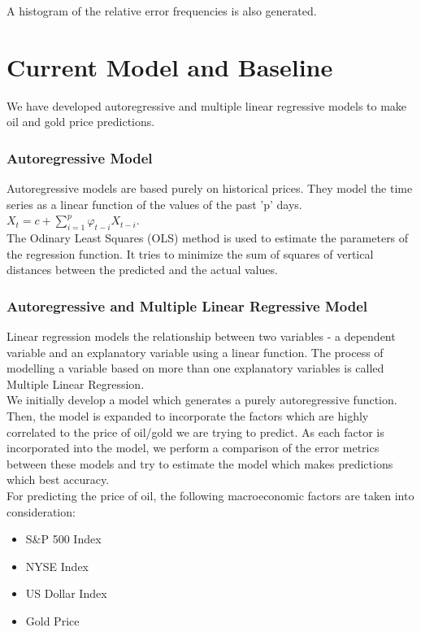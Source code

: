 \documentclass[runningheads]{llncs}
\begin{document}
A histogram of the relative error frequencies is also generated. \\

\newpage

\section{Current Model and Baseline}

We have developed autoregressive and multiple linear regressive models to make oil and gold price predictions.

\subsubsection{Autoregressive Model}
Autoregressive models are based purely on historical prices. They model the time series as a linear function of the values of the past 'p' days.\\

$ X_{t} = c + \sum\limits_{i=1}^p \varphi_{t-i}X_{t-i}$. \\

\noindent The Odinary Least Squares (OLS) method is used to estimate the parameters of the regression function. It tries to minimize the sum of squares of vertical distances between the predicted and the actual values. 

\subsubsection{Autoregressive and Multiple Linear Regressive Model}
Linear regression models the relationship between two variables - a dependent variable and an explanatory variable using a linear function. The process of modelling a variable based on more than one explanatory variables is called Multiple Linear Regression. \\
   
\noindent We initially develop a model which generates a purely autoregressive function. Then, the model is expanded to incorporate the factors which are highly correlated to the price of oil/gold we are trying to predict. As each factor is incorporated into the model, we perform a comparison of the error metrics between these models and try to estimate the model which makes predictions which best accuracy.\\

For predicting the price of oil, the following macroeconomic factors are taken into consideration:
\begin {itemize}
\item S\&P 500 Index
\item NYSE Index
\item US Dollar Index
\item Gold Price
\end {itemize}
\end{document}
